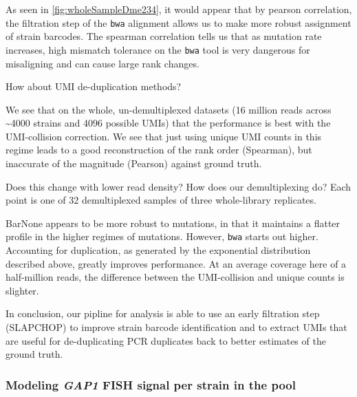 As seen in \autoref{fig:wholeSampleDme234}, 
it would appear that by pearson correlation, the filtration step of the
\texttt{bwa} alignment allows us to make more robust assignment of
strain barcodes. The spearman correlation tells us that as mutation rate
increases, high mismatch tolerance on the \texttt{bwa} tool is very
dangerous for misaligning and can cause large rank changes.




How about UMI de-duplication methods?

We see that on the whole, un-demultiplexed datasets (16 million reads
across \textasciitilde{}4000 strains and 4096 possible UMIs) that the
performance is best with the UMI-collision correction. We see that just
using unique UMI counts in this regime leads to a good reconstruction of
the rank order (Spearman), but inaccurate of the magnitude (Pearson)
against ground truth.

Does this change with lower read density? How does our demultiplexing
do? Each point is one of 32 demultiplexed samples of three whole-library
replicates.


BarNone appears to be more robust to mutations, in that it maintains a
flatter profile in the higher regimes of mutations. However,
\texttt{bwa} starts out higher. Accounting for duplication, as generated
by the exponential distribution described above, greatly improves
performance. At an average coverage here of a half-million reads, the
difference between the UMI-collision and unique counts is slighter.

In conclusion, our pipline for analysis is able to use an early
filtration step (SLAPCHOP) to improve strain barcode
identification and to extract UMIs that are useful for de-duplicating
PCR duplicates back to better estimates of the ground truth.

\subsubsection{Modeling \textit{GAP1} FISH signal per strain in the pool}

